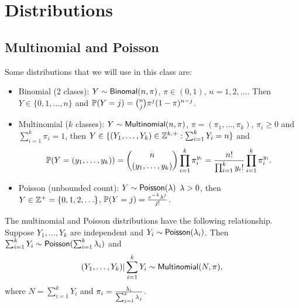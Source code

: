 \section{Distributions}
\subsection{Multinomial and Poisson}
Some distributions that we will use in this class are:
\begin{itemize}
    \item Binomial (2 clases): $Y \sim \mathsf{Binomal}(n,\pi)$, $\pi \in (0,1)$, $n=1,2,\ldots$. Then $Y \in \{0,1,\ldots,n\}$ and ${\mathbb{P}}(Y=j) = \binom{n}{j} \pi^j(1-\pi)^{n-j}$. 
    \item Multinomial ($k$ classes): $Y \sim \mathsf{Multinomial}(n,\pi)$, $\pi = (\pi_1,\ldots, \pi_k)$, $\pi_i \ge 0$ and $\sum_{i=1}^k \pi_i = 1$, then $Y \in \{(Y_1,\ldots,Y_k) \in {{\mathbb Z}}^{k,+}: \sum_{i=1}^k Y_i = n\}$ and 
    \[{\mathbb{P}}(Y=(y_1,\ldots,y_k)) = \binom{n}{(y_1,\ldots,y_k)} \prod_{i=1}^k \pi_i^{y_i} = \frac{n!}{\prod_{i=1}^k y_i!}\prod_{i=1}^k \pi_i^{y_i}.\]
    \item Poisson (unbounded count): $Y \sim \mathsf{Poisson}(\lambda) $ $\lambda > 0$, then $Y \in {{\mathbb Z}}^+ =\{0,1,2,\ldots\}$, ${\mathbb{P}}(Y=j) = \frac{e^{-\lambda}\lambda^j}{j!}$.
\end{itemize}
The multinomial and Poisson distributions have the following relationship. Suppose $Y_1,\ldots,Y_k$ are independent and $Y_i \sim \mathsf{Poisson}(\lambda_i)$. Then $\sum_{i=1}^k Y_i \sim \mathsf{Poisson}(\sum_{i=1}^k \lambda_i)$ and 
\[(Y_1,\ldots, Y_k)|\sum_{i=1}^k Y_i \sim \mathsf{Multinomial}(N,\pi), \]
where $N=\sum_{i=1}^k Y_i$ and $\pi_i = \frac{\lambda_i}{\sum_{j=1}^k \lambda_j}$.
